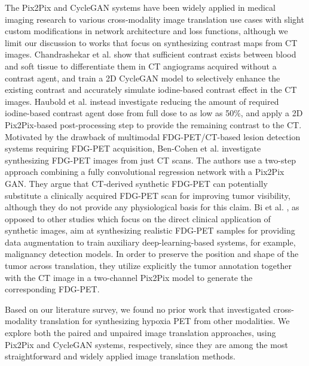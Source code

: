 The Pix2Pix and CycleGAN systems have been widely applied in medical imaging research to various cross-modality image translation use cases \cite{yi2019generative} with slight custom modifications in network architecture and loss functions, although we limit our discussion to works that focus on synthesizing contrast maps from CT images. Chandrashekar et al. \cite{chandrashekar2020deep} show that sufficient contrast exists between blood and soft tissue to differentiate them in CT angiograms acquired without a contrast agent, and train a 2D CycleGAN model to selectively enhance the existing contrast and accurately simulate iodine-based contrast effect in the CT images. Haubold et al. \cite{haubold2021contrast} instead investigate reducing the amount of required iodine-based contrast agent dose from full dose to as low as 50\%, and apply a 2D Pix2Pix-based post-processing step to provide the remaining contrast to the CT. Motivated by the drawback of multimodal FDG-PET/CT-based lesion detection systems requiring FDG-PET acquisition, Ben-Cohen et al. \cite{bencohen2018crossmodality} investigate synthesizing FDG-PET images from just CT scans. The authors use a two-step approach combining a fully convolutional regression network with a Pix2Pix GAN. They argue that CT-derived synthetic FDG-PET can potentially substitute a clinically acquired FDG-PET scan for improving tumor visibility, although they do not provide any physiological basis for this claim. Bi et al. \cite{bi2017synthesis}, as opposed to other studies which focus on the direct clinical application of synthetic images, aim at synthesizing realistic FDG-PET samples for providing data augmentation to train auxiliary deep-learning-based systems, for example, malignancy detection models. In order to preserve the position and shape of the tumor across translation, they utilize explicitly the tumor annotation together with the CT image in a two-channel Pix2Pix model to generate the corresponding FDG-PET. 

Based on our literature survey, we found no prior work that investigated cross-modality translation for synthesizing hypoxia PET from other modalities. We explore both the paired and unpaired image translation approaches, using Pix2Pix and CycleGAN systems, respectively, since they are among the most straightforward and widely applied image translation methods.



